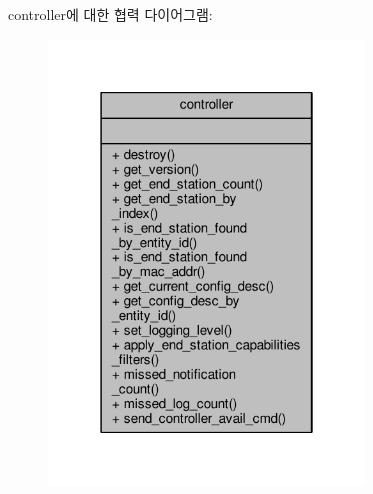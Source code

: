 controller에 대한 협력 다이어그램\+:
\nopagebreak
\begin{figure}[H]
\begin{center}
\leavevmode
\includegraphics[width=238pt]{classavdecc__lib_1_1controller__coll__graph}
\end{center}
\end{figure}

